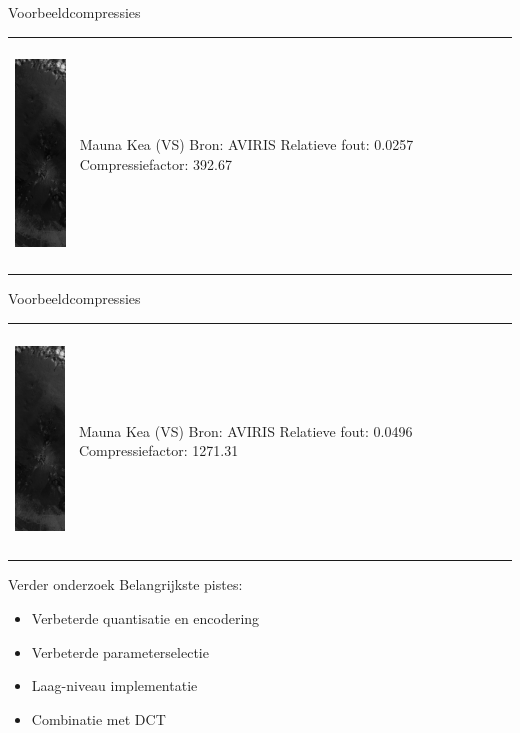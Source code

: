 \documentclass[t,12pt,dutch
\ifx\beamermode\undefined\else,\beamermode\fi
]{beamer}
\begin{document}
\begin{frame}{Voorbeeldcompressies}

\begin{table}[H]
\centering
\begin{tabular}{C{0.6\textwidth}  L{0.4\textwidth}}
\includegraphics[height=6cm]{images/example_compression_Mauna_Kea_0_025.png}
&
Mauna Kea (VS)\newline
Bron: AVIRIS\newline
\vspace{5mm}
Relatieve fout: 0.0257
Compressiefactor: 392.67
\end{tabular}
\end{table}

\end{frame}

\begin{frame}{Voorbeeldcompressies}

\begin{table}[H]
\centering
\begin{tabular}{C{0.6\textwidth}  L{0.4\textwidth}}
\includegraphics[height=6cm]{images/example_compression_Mauna_Kea_0_05.png}
&
Mauna Kea (VS)\newline
Bron: AVIRIS\newline
\vspace{5mm}
Relatieve fout: 0.0496
Compressiefactor: 1271.31
\end{tabular}
\end{table}

\end{frame}

\begin{frame}{Verder onderzoek}
Belangrijkste pistes:
\begin{itemize}
\item Verbeterde quantisatie en encodering
\item Verbeterde parameterselectie
\item Laag-niveau implementatie
\item Combinatie met DCT
\end{itemize}
\end{frame}
\end{document}
